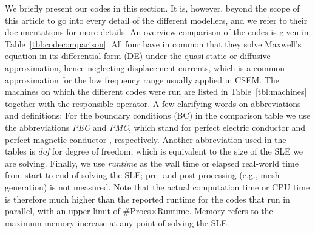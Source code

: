 \documentclass[
    paper,
  ]{geophysics}
\begin{document}
We briefly present our codes in this section. It is, however, beyond the scope of this article to go into every detail of the different modellers, and we refer to their documentations for more details. An overview comparison of the codes is given in Table~\ref{tbl:codecomparison}. All four have in common that they solve Maxwell's equation in its differential form (DE) under the quasi-static or diffusive approximation, hence neglecting displacement currents, which is a common approximation for the low frequency range usually applied in CSEM. The machines on which the different codes were run are listed in Table~\ref{tbl:machines} together with the responsible operator. A few clarifying words on abbreviations and definitions: For the boundary conditions (BC) in the comparison table we use the abbreviations \emph{PEC} and \emph{PMC}, which stand for perfect electric conductor
and perfect magnetic conductor%
, respectively. Another abbreviation used in the tables is \emph{dof} for degree of freedom, which is equivalent to the size of the SLE we are solving. Finally, we use \emph{runtime} as the wall time or elapsed real-world time from start to end of solving the SLE; pre- and post-processing (e.g., mesh generation) is not measured. Note that the actual computation time or CPU time is therefore much higher than the reported runtime for the codes that run in parallel, with an upper limit of \#Procs$\times$Runtime. Memory refers to the maximum memory increase at any point of solving the SLE.
\end{document}
